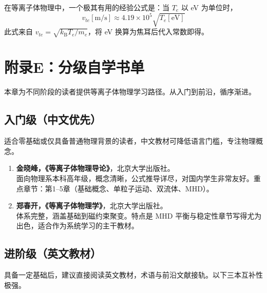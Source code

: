 \begin{tip}
在等离子体物理中，一个极其有用的经验公式是：当 $T_e$ 以 eV 为单位时，
\begin{equation}
v_{te} [\text{m/s}] \approx 4.19\times 10^5\sqrt{T_e [\text{eV}]}
\end{equation}
此式来自 $v_{te}=\sqrt{k_\mathrm{B}T_e/m_e}$，将 eV 换算为焦耳后代入常数即得。
\end{tip}


\chapter*{附录E：分级自学书单}

本章为不同阶段的读者提供等离子体物理学习路径。从入门到前沿，循序渐进。


\section{入门级（中文优先）}

适合零基础或仅具备普通物理背景的读者，中文教材可降低语言门槛，专注物理概念。

\begin{enumerate}
\item \textbf{金晓峰，《等离子体物理导论》}，北京大学出版社。\\
面向物理系本科高年级，概念清晰，公式推导详尽，对国内学生非常友好。重点章节：第1--5章（基础概念、单粒子运动、双流体、MHD）。

\item \textbf{郑春开，《等离子体物理学》}，北京大学出版社。\\
体系完整，涵盖基础到磁约束聚变。特点是 MHD 平衡与稳定性章节写得尤为出色，适合作为系统学习的主干教材。
\end{enumerate}


\section{进阶级（英文教材）}

具备一定基础后，建议直接阅读英文教材，术语与前沿文献接轨。以下三本互补性极强。


